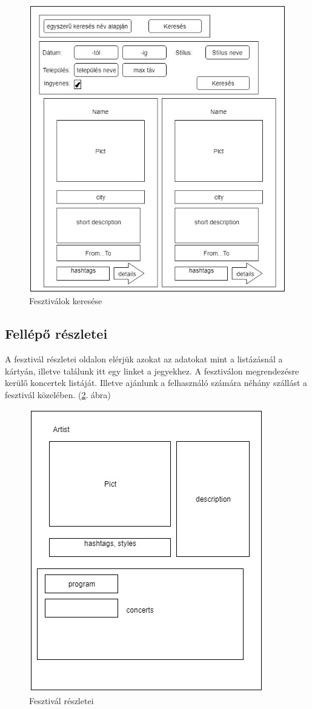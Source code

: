 \begin{figure}
\centering
\includegraphics[scale=0.5]{kepek/fest_search.jpg}
\caption{Fesztiválok keresése}
\label{fig:fest_search}
\end{figure}

\subsection{Fellépő részletei}
A fesztivál részletei oldalon elérjük azokat az adatokat mint a listázásnál a kártyán, illetve találunk itt egy linket a jegyekhez. A fesztiválon megrendezésre kerülő koncertek listáját. Illetve ajánlunk a felhasználó számára néhány szállást a fesztivál közelében. (\ref{fig:artist_details}. ábra)

\begin{figure}
\centering
\includegraphics[scale=0.5]{kepek/artist_details.jpg}
\caption{Fesztivál részletei}
\label{fig:artist_details}
\end{figure}
